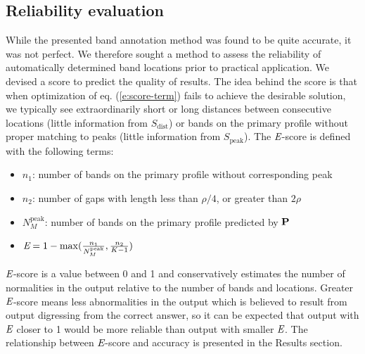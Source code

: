 \subsection{Reliability evaluation}\label{ss:reliability-evaluation}
While the presented band annotation method was found to be quite accurate, it was not perfect. We therefore sought a method to assess the reliability of automatically determined band locations prior to practical application. We devised a score to predict the quality of results. The idea behind the score is that when optimization of eq. (\ref{e:score-term}) fails to achieve the desirable solution, we typically see extraordinarily short or long distances between consecutive locations (little information from $S_\textrm{dist}$) or bands on the primary profile without proper matching to peaks (little information from $S_\textrm{peak}$). The ${\emph{E}}$-score is defined with the following terms:
\begin{itemize}
\item $n_1$: number of bands on the primary profile without corresponding peak
\item $n_2$: number of gaps with length less than $\rho/4$, or greater than $2\rho$
\item $N^\textrm{peak}_M$: number of bands on the primary profile predicted by ${\mathbf{P}}$
\item ${\emph{E}} = 1 - {\max({{n_1} \over N^\textrm{peak}_M}, {{n_2} \over {K-1}})}$
\end{itemize}
${\emph{E}}$-score is a value between 0 and 1 and conservatively estimates the number of normalities in the output relative to the number of bands and locations. Greater ${\emph{E}}$-score means less abnormalities in the output which is believed to result from output digressing from the correct answer, so it can be expected that output with ${\emph{E}}$ closer to 1 would be more reliable than output with smaller ${\emph{E}}$. The relationship between ${\emph{E}}$-score and accuracy is presented in the Results section.

